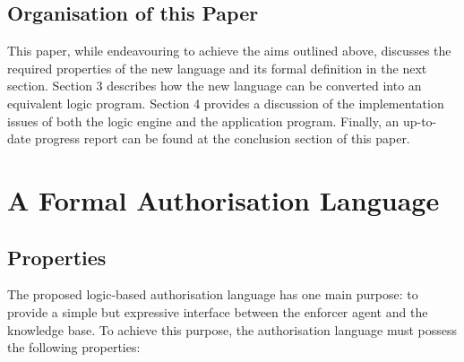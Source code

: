 \documentclass[a4paper]{article}
\begin{document}
    \subsection{Organisation of this Paper}

      This paper, while endeavouring to achieve the aims outlined above,
      discusses the required properties of the new language and its formal
      definition in the next section. Section 3 describes how the new language
      can be converted into an equivalent logic program. Section 4 provides
      a discussion of the implementation issues of both the logic engine and
      the application program. Finally, an up-to-date progress report can be
      found at the conclusion section of this paper.

  \section{A Formal Authorisation Language}

    \subsection{Properties}

      The proposed logic-based authorisation language has one main purpose:
      to provide a simple but expressive interface between the enforcer
      agent and the knowledge base. To achieve this purpose, the authorisation
      language must possess the following properties:
\end{document}
